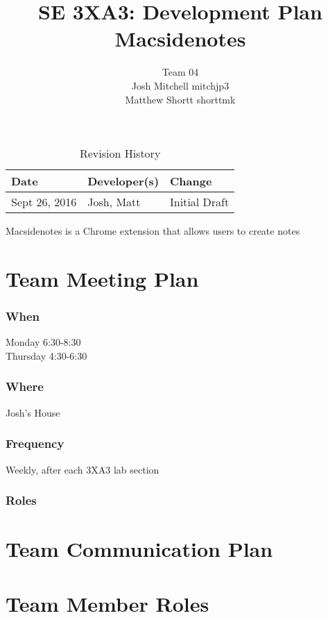 \documentclass{article}
\title{SE 3XA3: Development Plan\\Macsidenotes}
\author{Team 04
	\\ Josh Mitchell mitchjp3
	\\ Matthew Shortt shorttmk
}
\date{}
\begin{document}
	
	\begin{table}[hp]
		\caption{Revision History} \label{TblRevisionHistory}
		\begin{tabularx}{\textwidth}{llX}
			\toprule
			\textbf{Date} & \textbf{Developer(s)} & \textbf{Change}\\
			\midrule
			Sept 26, 2016 & Josh, Matt & Initial Draft\\
			\bottomrule
		\end{tabularx}
	\end{table}
	
	\newpage
	
	\maketitle
	
	Macsidenotes is a Chrome extension that allows users to create notes
	
	\section{Team Meeting Plan}
	\subsubsection*{When}
	Monday 6:30-8:30 \\
	Thursday 4:30-6:30
	\subsubsection*{Where}
	Josh's House\\
	\subsubsection*{Frequency}
	Weekly, after each 3XA3 lab section
	\subsubsection*{Roles}
	
	
	\section{Team Communication Plan}
	
	\section{Team Member Roles}
	
\end{document}
